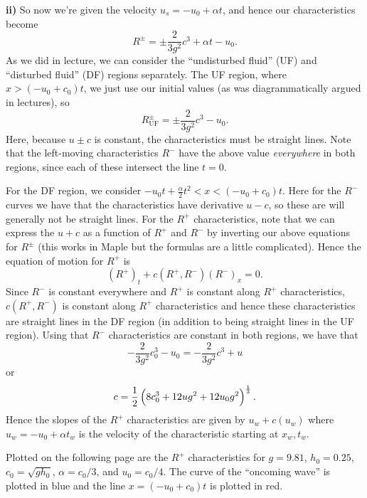 \documentclass{article}
\begin{document}
\textbf{ii)} So now we're given the velocity $u_s = - u_0 + \alpha t$, and hence our
characteristics become
%
\begin{equation*}
    R^\pm = \pm \frac{2}{3 g^2} c^3 + \alpha t - u_0
    .
\end{equation*}
%
As we did in lecture, we can consider the ``undisturbed fluid'' (UF) and
``disturbed fluid'' (DF) regions separately. The UF region, where $x >
(-u_0 + c_0) t$, we just use our initial values (as was diagrammatically
argued in lectures), so
%
\begin{equation*}
    R^\pm_{\text{UF}} = \pm \frac{2}{3 g^2} c^3 - u_0
    .
\end{equation*}
%
Here, because $u \pm c$ is constant, the characteristics must be
straight lines. Note that the left-moving characteristics $R^-$ have the
above value \textit{everywhere} in both regions, since each of these
intersect the line $t = 0$.

For the DF region, we consider $-u_0 t + \frac{\alpha}{2} t^2 < x < (-
u_0 + c_0) t$. Here for the $R^-$ curves we have that the
characteristics have derivative $u - c$, so these are will generally not
be straight lines. For the $R^+$ characteristics, note that we can
express the $u + c$ as a function of $R^+$ and $R^-$ by inverting our
above equations for $R^\pm$ (this works in Maple but the formulas are a
little complicated). Hence the equation of motion for $R^+$ is
%
\begin{equation*}
    (R^+)_t + c(R^+, R^-) (R^-)_x = 0
    .
\end{equation*}
%
Since $R^-$ is constant everywhere and $R^+$ is constant along $R^+$
characteristics, $c(R^+, R^-)$ is constant along $R^+$ characteristics
and hence these characteristics are straight lines in the DF region (in
addition to being straight lines in the UF region). Using that $R^-$
characteristics are constant in both regions, we have that
%
\begin{equation*}
    - \frac{2}{3 g^2} c_0^3 - u_0 = - \frac{2}{3 g^2} c^3 + u
\end{equation*}
%
or
%
\begin{equation*}
    c = \frac{1}{2} \del{8 c_0^3 + 12 u g^2 + 12 u_0 g^2}^\frac{1}{3}
    .
\end{equation*}
%
Hence the slopes of the $R^+$ characteristics are given by $u_w + c(u_w)$
where $u_w = -u_0 + \alpha t_w$ is the velocity of the characteristic
starting at $x_w, t_w$.

Plotted on the following page are the $R^+$ characteristics for $g =
9.81$, $h_0 = 0.25$, $c_0 = \sqrt{g h_0}$, $\alpha = c_0 / 3$, and $u_0
= c_0 / 4$. The curve of the ``oncoming wave'' is plotted in blue and
the line $x = (-u_0 + c_0) t$ is plotted in red.
\end{document}
